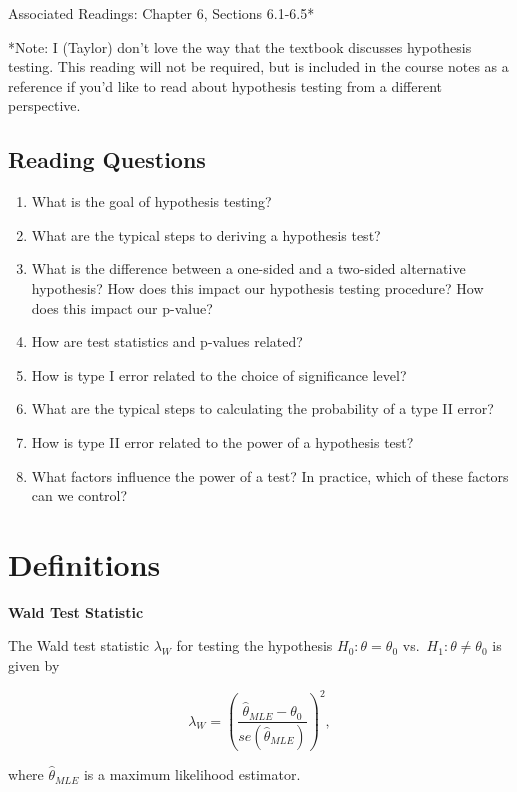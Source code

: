 \documentclass[
  letterpaper,
  DIV=11,
  numbers=noendperiod]{scrreprt}
\providecommand{\tightlist}{%
  \setlength{\itemsep}{0pt}\setlength{\parskip}{0pt}}\usepackage{longtable,booktabs,array}
\begin{document}
Associated Readings: Chapter 6, Sections 6.1-6.5*

*Note: I (Taylor) don't love the way that the textbook discusses
hypothesis testing. This reading will not be required, but is included
in the course notes as a reference if you'd like to read about
hypothesis testing from a different perspective.

\hypertarget{reading-questions-6}{%
\subsection{Reading Questions}\label{reading-questions-6}}

\begin{enumerate}
\def\labelenumi{\arabic{enumi}.}
\tightlist
\item
  What is the goal of hypothesis testing?
\item
  What are the typical steps to deriving a hypothesis test?
\item
  What is the difference between a one-sided and a two-sided alternative
  hypothesis? How does this impact our hypothesis testing procedure? How
  does this impact our p-value?
\item
  How are test statistics and p-values related?
\item
  How is type I error related to the choice of significance level?
\item
  What are the typical steps to calculating the probability of a type II
  error?
\item
  How is type II error related to the power of a hypothesis test?
\item
  What factors influence the power of a test? In practice, which of
  these factors can we control?
\end{enumerate}

\hypertarget{definitions-6}{%
\section{Definitions}\label{definitions-6}}

\textbf{Wald Test Statistic}

The Wald test statistic \(\lambda_W\) for testing the hypothesis
\(H_0: \theta = \theta_0\) vs.~\(H_1: \theta \neq \theta_0\) is given by

\[
\lambda_W = \left(\frac{\hat{\theta}_{MLE} - \theta_0}{se(\hat{\theta}_{MLE})}\right)^2,
\]

where \(\hat{\theta}_{MLE}\) is a maximum likelihood estimator.
\end{document}
